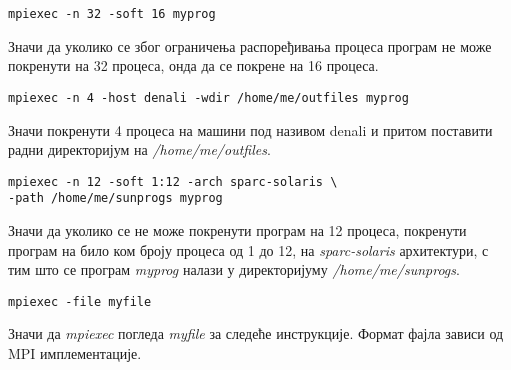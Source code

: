 \begin{Verbatim}
mpiexec -n 32 -soft 16 myprog
\end{Verbatim}
Значи да уколико се због ограничења распоређивања процеса програм не може покренути на 32 процеса, онда да се покрене на 16 процеса.
\begin{Verbatim}
mpiexec -n 4 -host denali -wdir /home/me/outfiles myprog
\end{Verbatim}
Значи покренути 4 процеса на машини под називом denali и притом поставити радни директоријум на \textit{/home/me/outfiles}.

\begin{Verbatim}
mpiexec -n 12 -soft 1:12 -arch sparc-solaris \
-path /home/me/sunprogs myprog
\end{Verbatim}

Значи да уколико се не може покренути програм на 12 процеса, покренути програм на било ком броју процеса од 1 до 12, на \textit{sparc-solaris} архитектури, с тим што се програм \textit{myprog} налази у директоријуму \textit{/home/me/sunprogs}. 

\begin{Verbatim}
mpiexec -file myfile
\end{Verbatim}
Значи да \textit{mpiexec} погледа \textit{myfile} за следеће инструкције. Формат фајла зависи од MPI имплементације.
